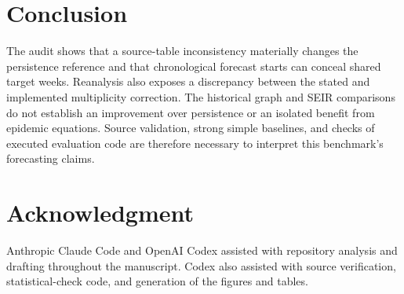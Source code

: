 \documentclass[conference]{IEEEtran}
\begin{document}
\section{Conclusion}
The audit shows that a source-table inconsistency materially changes the persistence reference and that chronological forecast starts can conceal shared target weeks.
Reanalysis also exposes a discrepancy between the stated and implemented multiplicity correction.
The historical graph and SEIR comparisons do not establish an improvement over persistence or an isolated benefit from epidemic equations.
Source validation, strong simple baselines, and checks of executed evaluation code are therefore necessary to interpret this benchmark's forecasting claims.

\section*{Acknowledgment}
Anthropic Claude Code and OpenAI Codex assisted with repository analysis and drafting throughout the manuscript.
Codex also assisted with source verification, statistical-check code, and generation of the figures and tables.



\end{document}
